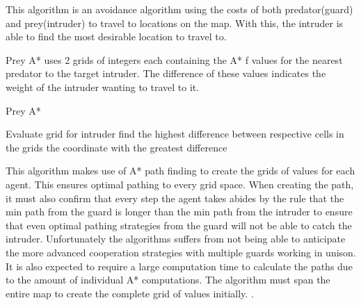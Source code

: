 This algorithm is an avoidance algorithm using the costs of both predator(guard) and prey(intruder) to travel to locations on the map. With this, the intruder is able to find the most desirable location to travel to.

    Prey A* uses 2 grids of integers each containing the A* f values for the nearest predator to the target intruder. The difference of these values indicates the weight of the intruder wanting to travel to it.
    
    \begin{algorithm}[h!]
    \label{preyAAlgorithm}
    \caption{Prey A*}
        Evaluate grid for intruder\;
        find the highest difference between respective cells in the grids\; 
        \Return the coordinate with the greatest difference\;
     \end{algorithm}   
    
    This algorithm makes use of A* path finding to create the grids of values for each agent. This ensures optimal pathing to every grid space. When creating the path, it must also confirm that every step the agent takes abides by the rule that the min path from the guard is longer than the min path from the intruder to ensure that even optimal pathing strategies from the guard will not be able to catch the intruder. 
    Unfortunately the algorithms suffers from not being able to anticipate the more advanced cooperation strategies with multiple guards working in unison. It is also expected to require a large computation time to calculate the paths due to the amount of individual A* computations. The algorithm must span the entire map to create the complete grid of values initially. \cite{undeger2009real, undeger2010multi, undeger2007single}.

